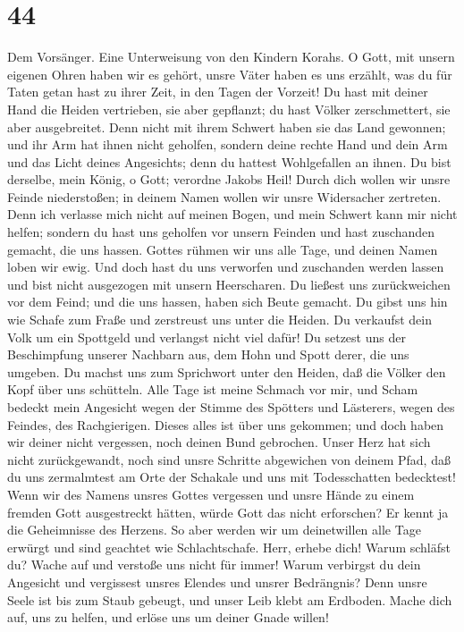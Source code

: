 \hypertarget{section-43}{%
\section{44}\label{section-43}}

 Dem Vorsänger. Eine Unterweisung von den Kindern Korahs.
O Gott, mit unsern eigenen Ohren haben wir es gehört, unsre Väter haben
es uns erzählt, was du für Taten getan hast zu ihrer Zeit, in den Tagen
der Vorzeit!  Du hast mit deiner Hand die Heiden
vertrieben, sie aber gepflanzt; du hast Völker zerschmettert, sie aber
ausgebreitet.  Denn nicht mit ihrem Schwert haben sie das
Land gewonnen; und ihr Arm hat ihnen nicht geholfen, sondern deine
rechte Hand und dein Arm und das Licht deines Angesichts; denn du
hattest Wohlgefallen an ihnen.  Du bist derselbe, mein
König, o Gott; verordne Jakobs Heil!  Durch dich wollen
wir unsre Feinde niederstoßen; in deinem Namen wollen wir unsre
Widersacher zertreten.  Denn ich verlasse mich nicht auf
meinen Bogen, und mein Schwert kann mir nicht helfen; 
sondern du hast uns geholfen vor unsern Feinden und hast zuschanden
gemacht, die uns hassen.  Gottes rühmen wir uns alle Tage,
und deinen Namen loben wir ewig.  Und doch hast du uns
verworfen und zuschanden werden lassen und bist nicht ausgezogen mit
unsern Heerscharen.  Du ließest uns zurückweichen vor dem
Feind; und die uns hassen, haben sich Beute gemacht.  Du
gibst uns hin wie Schafe zum Fraße und zerstreust uns unter die Heiden.
 Du verkaufst dein Volk um ein Spottgeld und verlangst
nicht viel dafür!  Du setzest uns der Beschimpfung
unserer Nachbarn aus, dem Hohn und Spott derer, die uns umgeben.
 Du machst uns zum Sprichwort unter den Heiden, daß die
Völker den Kopf über uns schütteln.  Alle Tage ist meine
Schmach vor mir, und Scham bedeckt mein Angesicht  wegen
der Stimme des Spötters und Lästerers, wegen des Feindes, des
Rachgierigen.  Dieses alles ist über uns gekommen; und
doch haben wir deiner nicht vergessen, noch deinen Bund gebrochen.
 Unser Herz hat sich nicht zurückgewandt, noch sind unsre
Schritte abgewichen von deinem Pfad,  daß du uns
zermalmtest am Orte der Schakale und uns mit Todesschatten bedecktest!
 Wenn wir des Namens unsres Gottes vergessen und unsre
Hände zu einem fremden Gott ausgestreckt hätten,  würde
Gott das nicht erforschen? Er kennt ja die Geheimnisse des Herzens.
 So aber werden wir um deinetwillen alle Tage erwürgt und
sind geachtet wie Schlachtschafe.  Herr, erhebe dich!
Warum schläfst du? Wache auf und verstoße uns nicht für immer!
 Warum verbirgst du dein Angesicht und vergissest unsres
Elendes und unsrer Bedrängnis?  Denn unsre Seele ist bis
zum Staub gebeugt, und unser Leib klebt am Erdboden. 
Mache dich auf, uns zu helfen, und erlöse uns um deiner Gnade willen!

